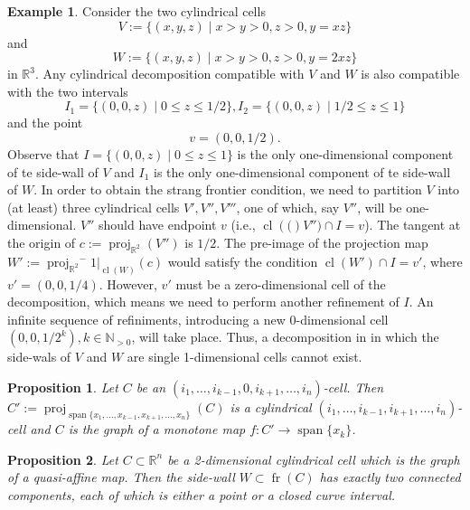 \documentclass[
]{book}
\newtheorem{proposition}{Proposition}[chapter]
\theoremstyle{definition}
\theoremstyle{definition}
\newtheorem{example}{Example}[chapter]
\theoremstyle{definition}
\theoremstyle{definition}
\theoremstyle{remark}
\begin{document}
\begin{example}
\protect\hypertarget{exm:side-wall}{}\label{exm:side-wall}Consider the two cylindrical cells
\[
V := \{ (x,y,z) \mid x > y > 0, z > 0, y = xz \}
\] and \[
W := \{ (x,y,z) \mid x > y > 0, z > 0, y = 2xz \}
\] in \(\mathbb{R}^3\).
Any cylindrical decomposition compatible with \(V\) and \(W\) is also compatible with the two intervals
\[
I_1 = \{ (0,0,z) \mid 0 \le z \le 1/2 \}, I_2 = \{ (0,0,z) \mid 1/2 \le z \le 1 \}
\]
and the point \[v = (0,0,1/2).\]
Observe that \(I = \{ (0,0,z) \mid 0 \le z \le 1 \}\) is the only one-dimensional component of te side-wall of \(V\) and \(I_1\) is the only one-dimensional component of te side-wall of \(W\). In order to obtain the strang frontier condition, we need to partition \(V\) into (at least) three cylindrical cells \(V',V'',V'''\), one of which, say \(V''\), will be one-dimensional. \(V''\) should have endpoint \(v\) (i.e., \({\operatorname{cl} \left( ( \right)}V'') \cap I = v\)).
The tangent at the origin of \(c := {\operatorname{proj}_{\mathbb{R}^{2}}}(V'')\) is \(1/2\). The pre-image of the projection map \(W' := {\operatorname{proj}_{\mathbb{R}^{2}}}^-1\vert_{{\operatorname{cl} \left( W \right)}}(c)\) would satisfy the condition \({\operatorname{cl} \left( W' \right)} \cap I = v'\), where \(v' = (0,0,1/4)\). However, \(v'\) must be a zero-dimensional cell of the decomposition, which means we need to perform another refinement of \(I\). An infinite sequence of refiniments, introducing a new 0-dimensional cell \((0,0,1/2^k), k \in \mathbb{N}_{> 0}\), will take place. Thus, a decomposition in in which the side-wals of \(V\) and \(W\) are single 1-dimensional cells cannot exist.
\end{example}

\begin{proposition}
\citep[Lemma 3.3]{bgv15}
Let \(C\) be an \((i_1,\ldots,i_{k-1},0,i_{k+1},\ldots,i_n)\)-cell. Then \(C' := {\operatorname{proj}_{{\operatorname{span} \{x_1,\ldots,x_{k-1},x_{k+1},\ldots,x_n\}}}}(C)\) is a cylindrical \((i_1,\ldots,i_{k-1},i_{k+1},\ldots,i_n)\)-cell and \(C\) is the graph of a monotone map \(f : C' \to {\operatorname{span} \{x_k\}}\).
\end{proposition}

\begin{proposition}
\citep[Lemma 3.4]{bgv15}
Let \(C \subset \mathbb{R}^n\) be a 2-dimensional cylindrical cell which is the graph of a quasi-affine map. Then the side-wall \(W \subset {\operatorname{fr} \left( C \right)}\) has exactly two connected components, each of which is either a point or a closed curve interval.
\end{proposition}
\end{document}
